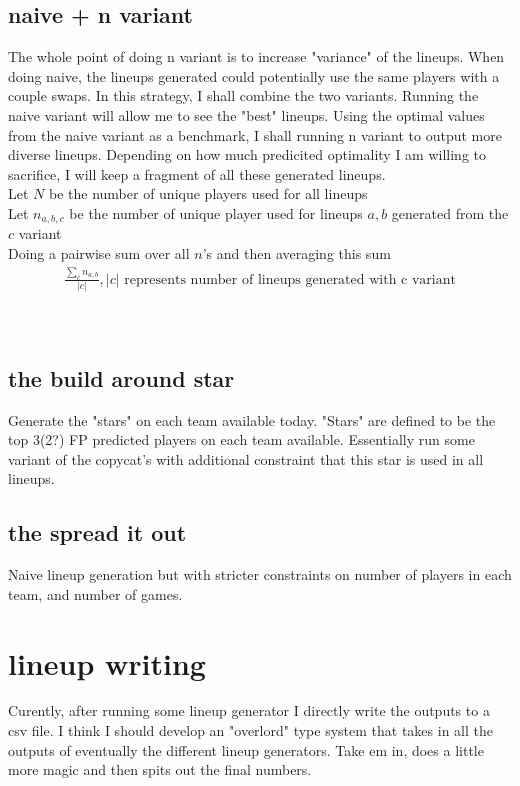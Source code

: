 \documentclass[11pt, oneside]{book}   	%
\begin{document}
\subsection{naive + n variant}
The whole point of doing n variant is to increase "variance" of the lineups. When doing naive, the lineups generated could potentially use the same players with a couple swaps. In this strategy, I shall combine the two variants. Running the naive variant will allow me to see the "best" lineups. Using the optimal values from the naive variant as a benchmark, I shall running n variant to output more diverse lineups. Depending on how much predicited optimality I am willing to sacrifice, I will keep a fragment of all these generated lineups.
\\
Let $N$ be the number of unique players used for all lineups \\
Let $n_{a,b,c}$ be the number of unique player used for lineups $a,b$ generated from the $c$ variant\\
Doing a pairwise sum over all $n$'s and then averaging this sum\\
\begin{gather}
\frac{\sum_{c} n_{a,b}}{|c|}, |c| \text{ represents number of lineups generated with c variant}
\end{gather}
\\
\\
\subsection{the build around star}
Generate the "stars" on each team available today. "Stars" are defined to be the top 3(2?) FP predicted players on each team available. Essentially run some variant of the copycat's with additional constraint that this star is used in all lineups.
\subsection{the spread it out}
Naive lineup generation but with stricter constraints on number of players in each team, and number of games. 


\section{lineup writing}
Curently, after running some lineup generator I directly write the outputs to a csv file. I think I should develop an "overlord" type system that takes in all the outputs of eventually the different lineup generators. Take em in, does a little more magic and then spits out the final numbers.
\end{document}
